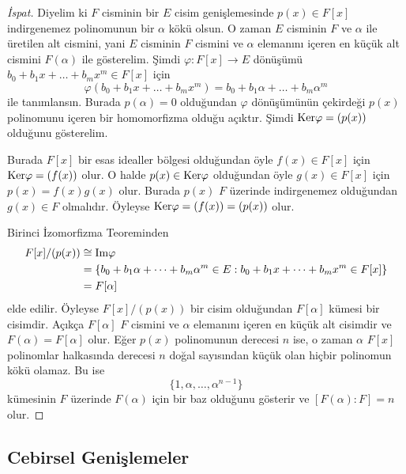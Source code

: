 \documentclass[draft]{article}
\theoremstyle{definition}
\theoremstyle{remark}
\begin{document}
			\begin{proof}[İspat]
			    Diyelim ki $F$ cisminin bir $E$ cisim genişlemesinde $p(x) \in F[x]$ indirgenemez polinomunun bir $\alpha$ kökü olsun. O zaman $E$ cisminin $F$ ve $\alpha$ ile üretilen alt cismini, yani $E$ cisminin $F$ cismini ve $\alpha$ elemanını içeren en küçük alt cismini $F(\alpha)$ ile gösterelim. Şimdi $\varphi : F[x] \to E$ dönüşümü $b_0 + b_1x + \dots + b_mx^m \in F[x]$ için
			    \begin{equation*}
			        \varphi(b_0 + b_1x + \dots + b_mx^m) = b_0 + b_1\alpha + \dots + b_m\alpha^m
			    \end{equation*}
			    ile tanımlansın. Burada $p(\alpha) = 0$ olduğundan $\varphi$ dönüşümünün çekirdeği $p(x)$ polinomunu içeren bir homomorfizma olduğu açıktır. Şimdi $\textup{Ker}\varphi = (p(x))$ olduğunu gösterelim.\par
			    Burada $F[x]$ bir esas idealler bölgesi olduğundan öyle $f(x) \in F[x]$ için $\textup{Ker}\varphi = (f(x))$ olur. O halde $p(x) \in \textup{Ker}\varphi$ olduğundan öyle $g(x) \in F[x]$ için $p(x) = f(x)g(x)$ olur. Burada $p(x)$ $F$ üzerinde indirgenemez olduğundan $g(x) \in F$ olmalıdır. Öyleyse $\textup{Ker}\varphi = (f(x)) = (p(x))$ olur.\par
			    Birinci İzomorfizma Teoreminden
			    \begin{align*}
			        F[x]/(p(x)) &\cong \textup{Im}\varphi\\
			        &= \{b_0 + b_1\alpha + \dots + b_m\alpha^m \in E : b_0 + b_1x + \dots + b_mx^m \in F[x]\}\\
			        &= F[\alpha]
			    \end{align*}
			    elde edilir. Öyleyse $F[x]/(p(x))$ bir cisim olduğundan $F[\alpha]$ kümesi bir cisimdir. Açıkça $F[\alpha]$ $F$ cismini ve $\alpha$ elemanını içeren en küçük alt cisimdir ve $F(\alpha) = F[\alpha]$ olur. Eğer $p(x)$ polinomunun derecesi $n$ ise, o zaman $\alpha$ $F[x]$ polinomlar halkasında derecesi $n$ doğal sayısından küçük olan hiçbir polinomun kökü olamaz. Bu ise
			    \begin{equation*}
			        \{1, \alpha, \dots, \alpha^{n - 1}\}
			    \end{equation*}
			    kümesinin $F$ üzerinde $F(\alpha)$ için bir baz olduğunu gösterir ve $[F(\alpha) : F] = n$ olur.
			\end{proof}
			
		\subsection{Cebirsel Genişlemeler}
		
\end{document}
